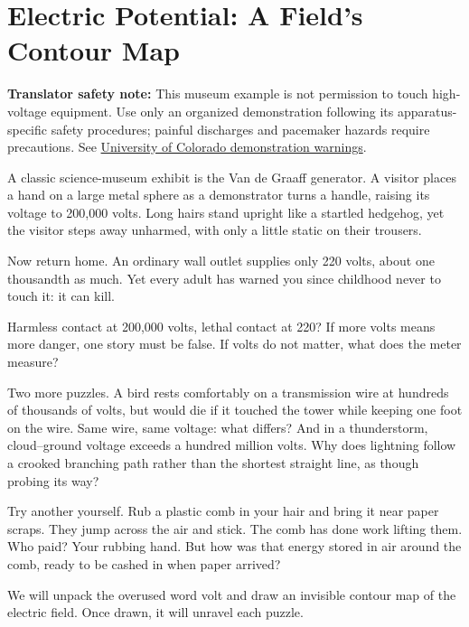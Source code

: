 \chapter{Electric Potential: A Field's Contour Map}


\begin{mainline}
\textbf{Translator safety note:} This museum example is not permission to touch high-voltage equipment. Use only an organized demonstration following its apparatus-specific safety procedures; painful discharges and pacemaker hazards require precautions. See \href{https://physicslabs.colorado.edu/demos/electricity-and-magnetism/electrostatics/electrostatic-machines/dissectible-van-de-graaff/}{University of Colorado demonstration warnings}.

A classic science-museum exhibit is the Van de Graaff generator. A visitor places a hand on a large metal sphere as a demonstrator turns a handle, raising its voltage to 200,000 volts. Long hairs stand upright like a startled hedgehog, yet the visitor steps away unharmed, with only a little static on their trousers.

Now return home. An ordinary wall outlet supplies only 220 volts, about one thousandth as much. Yet every adult has warned you since childhood never to touch it: it can kill.

Harmless contact at 200,000 volts, lethal contact at 220? If more volts means more danger, one story must be false. If volts do not matter, what does the meter measure?

Two more puzzles. A bird rests comfortably on a transmission wire at hundreds of thousands of volts, but would die if it touched the tower while keeping one foot on the wire. Same wire, same voltage: what differs? And in a thunderstorm, cloud--ground voltage exceeds a hundred million volts. Why does lightning follow a crooked branching path rather than the shortest straight line, as though probing its way?

Try another yourself. Rub a plastic comb in your hair and bring it near paper scraps. They jump across the air and stick. The comb has done work lifting them. Who paid? Your rubbing hand. But how was that energy stored in air around the comb, ready to be cashed in when paper arrived?

We will unpack the overused word volt and draw an invisible contour map of the electric field. Once drawn, it will unravel each puzzle.
\end{mainline}

